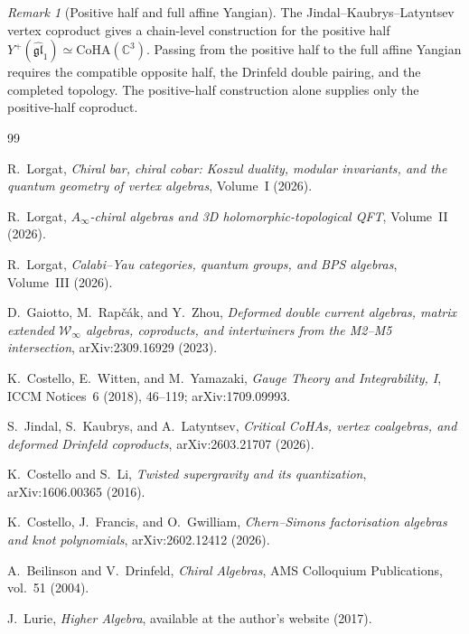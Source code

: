 \documentclass[11pt]{article}
\theoremstyle{remark}
\newtheorem{remark}[theorem]{Remark}
\providecommand{\bC}{\mathbb{C}}
\providecommand{\fgl}{\mathfrak{gl}}
\begin{document}
\begin{remark}[Positive half and full affine Yangian]
The Jindal--Kaubrys--Latyntsev vertex coproduct gives a chain-level
construction for the positive half
$Y^+(\widehat{\fgl}_1)\simeq \mathrm{CoHA}(\bC^3)$.  Passing from the
positive half to the full affine Yangian requires the compatible
opposite half, the Drinfeld double pairing, and the completed
topology.  The positive-half construction alone supplies only the
positive-half coproduct.
\end{remark}



\begin{thebibliography}{99}

R.~Lorgat,
\textit{Chiral bar, chiral cobar: Koszul duality, modular invariants,
  and the quantum geometry of vertex algebras},
Volume~I (2026).

R.~Lorgat,
\textit{$A_\infty$-chiral algebras and 3D holomorphic-topological QFT},
Volume~II (2026).

R.~Lorgat,
\textit{Calabi--Yau categories, quantum groups, and BPS algebras},
Volume~III (2026).

D.~Gaiotto, M.~Rap\v{c}\'ak, and Y.~Zhou,
\textit{Deformed double current algebras, matrix extended
  $\mathcal{W}_\infty$ algebras, coproducts, and intertwiners from
  the M2--M5 intersection},
arXiv:2309.16929 (2023).

K.~Costello, E.~Witten, and M.~Yamazaki,
\textit{Gauge Theory and Integrability, I},
ICCM Notices~6 (2018), 46--119; arXiv:1709.09993.

S.~Jindal, S.~Kaubrys, and A.~Latyntsev,
\textit{Critical CoHAs, vertex coalgebras, and deformed Drinfeld
  coproducts},
arXiv:2603.21707 (2026).

K.~Costello and S.~Li,
\textit{Twisted supergravity and its quantization},
arXiv:1606.00365 (2016).

K.~Costello, J.~Francis, and O.~Gwilliam,
\textit{Chern--Simons factorisation algebras and knot polynomials},
arXiv:2602.12412 (2026).

A.~Beilinson and V.~Drinfeld,
\textit{Chiral Algebras},
AMS Colloquium Publications, vol.~51 (2004).

J.~Lurie,
\textit{Higher Algebra},
available at the author's website (2017).

\end{thebibliography}
\end{document}
